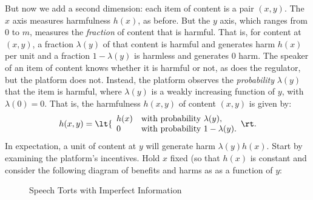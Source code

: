 But now we add a second dimension: each item of content is a pair $(x,y)$.  The $x$ axis measures harmfulness $h(x)$, as before. But the $y$ axis, which ranges from $0$ to $m$, measures the \emph{fraction} of content that is harmful. That is, for content at $(x,y)$, a fraction $\lambda(y)$ of that content is harmful and generates harm $h(x)$ per unit and a fraction $ 1- \lambda(y)$ is harmless and generates $0$ harm. The speaker of an item of content knows whether it is harmful or not, as does the regulator, but the platform does not. Instead, the platform observes the \emph{probability} $\lambda(y)$ that the item is harmful, where $\lambda(y)$ is a weakly increasing function of $y$, with $\lambda(0) = 0$. That is, the harmfulness $h(x,y)$ of content $(x,y)$ is given by:
\begin{equation}
h(x,y)=
\lt\{\begin{array}{ll}
    h(x) & \mbox{with probability $\lambda(y)$}, \\
    0 & \mbox{with probability $1 - \lambda(y)$}.
\end{array}\rt.
\end{equation}
In expectation, a unit of content at $y$ will generate harm $\lambda(y)h(x)$. Start by examining the platform's incentives. Hold $x$ fixed (so that $h(x)$ is constant and consider the following diagram of benefits and harms as as a function of $y$:
\begin{figure}[h]
    \centering
{}
    \caption{Speech Torts with Imperfect Information}
    \label{fig:speechimperfect}
\end{figure}
